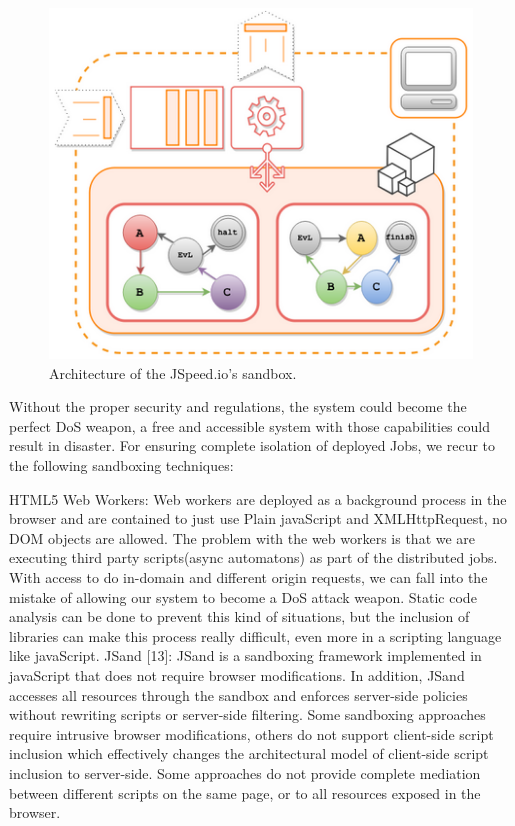 \documentclass[10pt,reprint]{socc14}
\begin{document}

\begin{figure}[h]	
	\centering
	\includegraphics[scale=0.6]{sandboxDiagram}
	\caption{Architecture of the JSpeed.io’s sandbox.}
\end{figure}


Without the proper security and regulations, the system could become the perfect DoS weapon, a free and accessible system with those capabilities could result in disaster. For ensuring complete isolation of deployed Jobs, we recur to the following sandboxing techniques:

HTML5 Web Workers: Web workers are deployed as a background process in the browser and are contained to just use Plain javaScript and XMLHttpRequest, no DOM objects are allowed. The problem with the web workers is that we are executing third party scripts(async automatons) as part of the distributed jobs. With access to do in-domain and different origin requests, we can fall into the mistake of allowing our system to become a DoS attack weapon. Static code analysis can be done to prevent this kind of situations, but the inclusion of libraries can make this process really difficult, even more in a scripting language like javaScript.
JSand [13]: JSand is a sandboxing framework implemented in javaScript that does not require browser modifications. In addition, JSand accesses all resources through the sandbox and enforces server-side policies without rewriting scripts or server-side filtering. Some sandboxing approaches require intrusive browser modifications, others do not support client-side script inclusion which effectively changes the architectural model of client-side script inclusion to server-side. Some approaches do not provide complete mediation between different scripts on the same page, or to all resources exposed in the browser.
\end{document}
